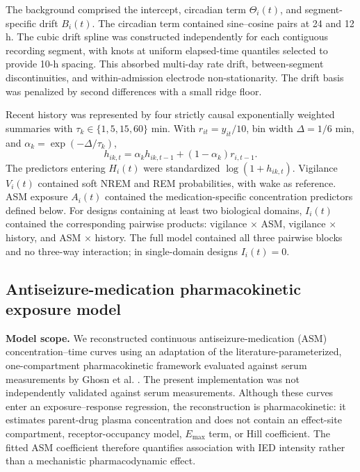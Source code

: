 \documentclass[11pt]{article}
\begin{document}
The background comprised the intercept, circadian term $\Theta_i(t)$, and segment-specific drift $B_i(t)$. The circadian term contained sine--cosine pairs at 24 and 12 h. The cubic drift spline was constructed independently for each contiguous recording segment, with knots at uniform elapsed-time quantiles selected to provide 10-h spacing. This absorbed multi-day rate drift, between-segment discontinuities, and within-admission electrode non-stationarity. The drift basis was penalized by second differences with a small ridge floor.

Recent history was represented by four strictly causal exponentially weighted summaries with $\tau_k\in\{1,5,15,60\}$ min. With $r_{it}=y_{it}/10$, bin width $\Delta=1/6$ min, and $\alpha_k=\exp(-\Delta/\tau_k)$,
\begin{equation}
h_{ik,t}=\alpha_k h_{ik,t-1}+(1-\alpha_k)r_{i,t-1}.
\label{eq:ewma}
\end{equation}
The predictors entering $H_i(t)$ were standardized $\log(1+h_{ik,t})$. Vigilance $V_i(t)$ contained soft NREM and REM probabilities, with wake as reference. ASM exposure $A_i(t)$ contained the medication-specific concentration predictors defined below. For designs containing at least two biological domains, $I_i(t)$ contained the corresponding pairwise products: vigilance $\times$ ASM, vigilance $\times$ history, and ASM $\times$ history. The full model contained all three pairwise blocks and no three-way interaction; in single-domain designs $I_i(t)=0$.

\subsection*{Antiseizure-medication pharmacokinetic exposure model}

\textbf{Model scope.} We reconstructed continuous antiseizure-medication (ASM) concentration--time curves using an adaptation of the literature-parameterized, one-compartment pharmacokinetic framework evaluated against serum measurements by Ghosn et al. \cite{Ghosn2023}. The present implementation was not independently validated against serum measurements. Although these curves enter an exposure--response regression, the reconstruction is pharmacokinetic: it estimates parent-drug plasma concentration and does not contain an effect-site compartment, receptor-occupancy model, $E_{\max}$ term, or Hill coefficient. The fitted ASM coefficient therefore quantifies association with IED intensity rather than a mechanistic pharmacodynamic effect.
\end{document}
